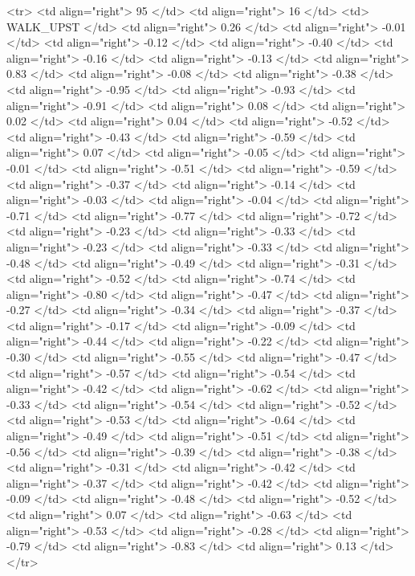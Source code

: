   <tr> <td align="right"> 95 </td> <td align="right">  16 </td> <td> WALK_UPST </td> <td align="right"> 0.26 </td> <td align="right"> -0.01 </td> <td align="right"> -0.12 </td> <td align="right"> -0.40 </td> <td align="right"> -0.16 </td> <td align="right"> -0.13 </td> <td align="right"> 0.83 </td> <td align="right"> -0.08 </td> <td align="right"> -0.38 </td> <td align="right"> -0.95 </td> <td align="right"> -0.93 </td> <td align="right"> -0.91 </td> <td align="right"> 0.08 </td> <td align="right"> 0.02 </td> <td align="right"> 0.04 </td> <td align="right"> -0.52 </td> <td align="right"> -0.43 </td> <td align="right"> -0.59 </td> <td align="right"> 0.07 </td> <td align="right"> -0.05 </td> <td align="right"> -0.01 </td> <td align="right"> -0.51 </td> <td align="right"> -0.59 </td> <td align="right"> -0.37 </td> <td align="right"> -0.14 </td> <td align="right"> -0.03 </td> <td align="right"> -0.04 </td> <td align="right"> -0.71 </td> <td align="right"> -0.77 </td> <td align="right"> -0.72 </td> <td align="right"> -0.23 </td> <td align="right"> -0.33 </td> <td align="right"> -0.23 </td> <td align="right"> -0.33 </td> <td align="right"> -0.48 </td> <td align="right"> -0.49 </td> <td align="right"> -0.31 </td> <td align="right"> -0.52 </td> <td align="right"> -0.74 </td> <td align="right"> -0.80 </td> <td align="right"> -0.47 </td> <td align="right"> -0.27 </td> <td align="right"> -0.34 </td> <td align="right"> -0.37 </td> <td align="right"> -0.17 </td> <td align="right"> -0.09 </td> <td align="right"> -0.44 </td> <td align="right"> -0.22 </td> <td align="right"> -0.30 </td> <td align="right"> -0.55 </td> <td align="right"> -0.47 </td> <td align="right"> -0.57 </td> <td align="right"> -0.54 </td> <td align="right"> -0.42 </td> <td align="right"> -0.62 </td> <td align="right"> -0.33 </td> <td align="right"> -0.54 </td> <td align="right"> -0.52 </td> <td align="right"> -0.53 </td> <td align="right"> -0.64 </td> <td align="right"> -0.49 </td> <td align="right"> -0.51 </td> <td align="right"> -0.56 </td> <td align="right"> -0.39 </td> <td align="right"> -0.38 </td> <td align="right"> -0.31 </td> <td align="right"> -0.42 </td> <td align="right"> -0.37 </td> <td align="right"> -0.42 </td> <td align="right"> -0.09 </td> <td align="right"> -0.48 </td> <td align="right"> -0.52 </td> <td align="right"> 0.07 </td> <td align="right"> -0.63 </td> <td align="right"> -0.53 </td> <td align="right"> -0.28 </td> <td align="right"> -0.79 </td> <td align="right"> -0.83 </td> <td align="right"> 0.13 </td> </tr>
